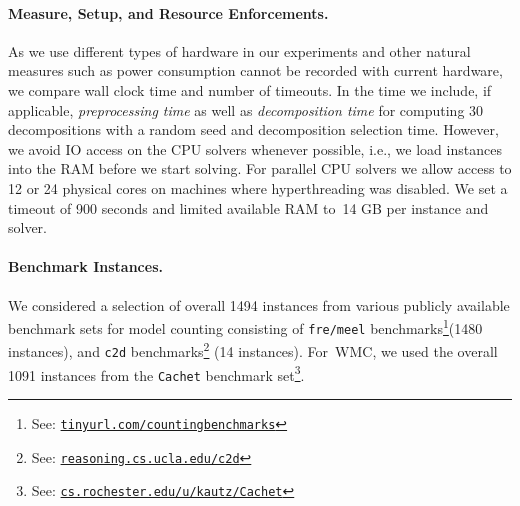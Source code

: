 \documentclass{llncs}
\newcommand{\WMC}{\textsc{WMC}\xspace}%
\newcommand{\instances}[1]{\texttt{#1}}
\begin{document}
\paragraph{Measure, Setup, and Resource Enforcements.}
As we use different types of hardware in our experiments and other
natural measures such as power consumption cannot be recorded with
current hardware, we compare wall clock time and number of
timeouts. In the time we include, if applicable, \emph{preprocessing
  time} as well as \emph{decomposition time} for computing 30
decompositions with a random seed and decomposition selection time.
%
However, we avoid IO access on the CPU solvers whenever possible,
i.e., we load instances into the RAM before we start solving.
%
For parallel CPU solvers we allow access to 12 or 24 physical cores on
machines where hyperthreading was disabled.
%
%
%
%
%
We set a timeout of 900 seconds and limited available RAM to~14 GB per
instance and solver.

\paragraph{Benchmark Instances.}
We considered a selection of overall 1494 instances from various
publicly available benchmark sets for model counting consisting of %
%
%
%
%
\instances{fre/meel} benchmarks\footnote{See:
  \href{http://tinyurl.com/countingbenchmarks}{\nolinkurl{tinyurl.com/countingbenchmarks}}}(1480
instances), %
and \instances{c2d} benchmarks\footnote{See:
  \href{http://reasoning.cs.ucla.edu/c2d/results.html}{\nolinkurl{reasoning.cs.ucla.edu/c2d}}}
(14 instances).
%
For~\WMC, we used the overall 1091 instances from the
\instances{Cachet} benchmark set\footnote{See:
  \href{https://www.cs.rochester.edu/u/kautz/Cachet/Model_Counting_Benchmarks/index.html}{\nolinkurl{cs.rochester.edu/u/kautz/Cachet}}}.
%
\end{document}

